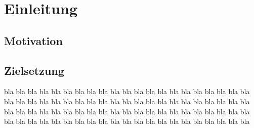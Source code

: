 \chapter{Einleitung} \label{cha:Einleitung}	

\lipsum[1]

\section{Motivation}\label{sec:Motivation}

\lipsum[1]

\section{Zielsetzung}\label{sec:Zielsetzung}

\lipsum[1]
bla bla bla bla bla bla bla bla bla bla bla bla bla bla bla bla bla bla bla bla bla
bla bla bla bla bla bla bla bla bla bla bla bla bla bla bla bla bla bla bla bla bla
bla bla bla bla bla bla bla bla bla bla bla bla bla bla bla bla bla bla bla bla bla
bla bla bla bla bla bla bla bla bla bla bla bla bla bla bla bla bla bla bla bla bla

